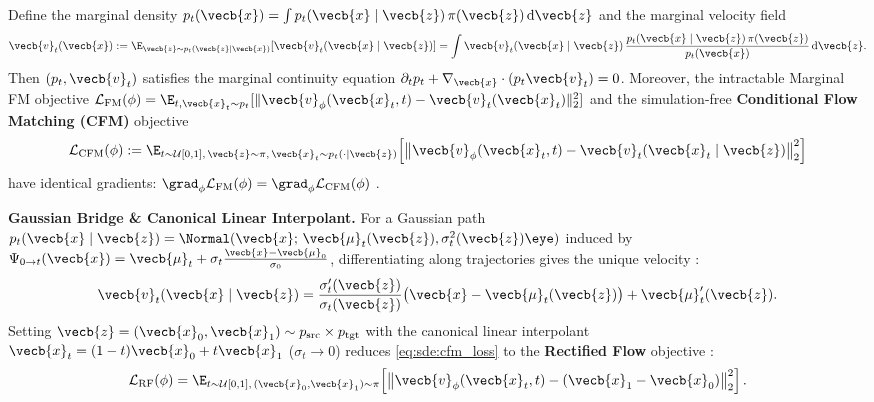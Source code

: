 \documentclass[../../../../master.tex]{subfiles}
\begin{document}
\begin{coremath}
Define the marginal density $p_t(\vecb{x}) = \int p_t(\vecb{x} \mid \vecb{z})\,\pi(\vecb{z})\,\mathrm{d}\vecb{z}$ and the marginal velocity field
\begin{equation}\label{eq:sde:marginal_velocity}
  \vecb{v}_t(\vecb{x}) := \E_{\vecb{z} \sim p_t(\vecb{z} \mid \vecb{x})}\!\left[\vecb{v}_t(\vecb{x} \mid \vecb{z})\right] = \int \vecb{v}_t(\vecb{x} \mid \vecb{z})\,\frac{p_t(\vecb{x} \mid \vecb{z})\,\pi(\vecb{z})}{p_t(\vecb{x})}\,\mathrm{d}\vecb{z}.
\end{equation}
Then $(p_t, \vecb{v}_t)$ satisfies the marginal continuity equation $\partial_t p_t + \nabla_{\vecb{x}}\cdot(p_t \vecb{v}_t) = 0$. Moreover, the intractable Marginal FM objective $\mathcal{L}_{\mathrm{FM}}(\phi) = \E_{t, \vecb{x}_t \sim p_t}[\|\vecb{v}_\phi(\vecb{x}_t, t) - \vecb{v}_t(\vecb{x}_t)\|_2^2]$ and the simulation-free \textbf{Conditional Flow Matching (CFM)} objective
\begin{equation}\label{eq:sde:cfm_loss}
  \mathcal{L}_{\mathrm{CFM}}(\phi) := \E_{t \sim \mathcal{U}[0,1],\, \vecb{z} \sim \pi,\, \vecb{x}_t \sim p_t(\cdot \mid \vecb{z})}\!\left[ \bigl\|\vecb{v}_\phi(\vecb{x}_t, t) - \vecb{v}_t(\vecb{x}_t \mid \vecb{z})\bigr\|_2^2 \right]
\end{equation}
have identical gradients: $\grad_\phi \mathcal{L}_{\mathrm{FM}}(\phi) = \grad_\phi \mathcal{L}_{\mathrm{CFM}}(\phi)$ .

\textbf{Gaussian Bridge \& Canonical Linear Interpolant.} For a Gaussian path $p_t(\vecb{x} \mid \vecb{z}) = \Normal(\vecb{x};\, \vecb{\mu}_t(\vecb{z}), \sigma_t^2(\vecb{z})\eye)$ induced by $\Psi_{0 \to t}(\vecb{x}) = \vecb{\mu}_t + \sigma_t \frac{\vecb{x}-\vecb{\mu}_0}{\sigma_0}$, differentiating along trajectories gives the unique velocity :
\begin{equation}\label{eq:sde:gaussian_bridge_v}
  \vecb{v}_t(\vecb{x} \mid \vecb{z}) = \frac{\sigma_t'(\vecb{z})}{\sigma_t(\vecb{z})}\bigl(\vecb{x} - \vecb{\mu}_t(\vecb{z})\bigr) + \vecb{\mu}_t'(\vecb{z}).
\end{equation}
Setting $\vecb{z} = (\vecb{x}_0, \vecb{x}_1) \sim p_{\mathrm{src}} \times p_{\mathrm{tgt}}$ with the canonical linear interpolant $\vecb{x}_t = (1-t)\vecb{x}_0 + t\vecb{x}_1$ ($\sigma_t \to 0$) reduces \eqref{eq:sde:cfm_loss} to the \textbf{Rectified Flow} objective :
\begin{equation}\label{eq:sde:rf_loss}
  \mathcal{L}_{\mathrm{RF}}(\phi) = \E_{t \sim \mathcal{U}[0,1],\, (\vecb{x}_0, \vecb{x}_1) \sim \pi}\!\left[ \bigl\|\vecb{v}_\phi(\vecb{x}_t, t) - (\vecb{x}_1 - \vecb{x}_0)\bigr\|_2^2 \right].
\end{equation}
\end{coremath}
\end{document}
